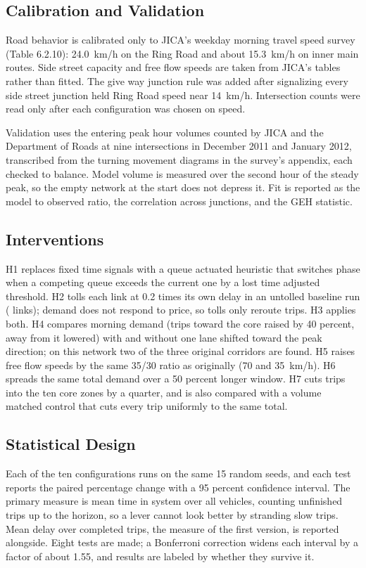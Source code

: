 \subsection{Calibration and Validation}
Road behavior is calibrated only to JICA's weekday morning travel speed survey (Table 6.2.10):
24.0~km/h on the Ring Road and about 15.3~km/h on inner main routes. Side street capacity and free
flow speeds are taken from JICA's tables rather than fitted. The give way junction rule was added
after signalizing every side street junction held Ring Road speed near 14~km/h. Intersection
counts were read only after each configuration was chosen on speed.

Validation uses the entering peak hour volumes counted by JICA and the Department of Roads at nine
intersections in December 2011 and January 2012, transcribed from the turning movement diagrams in
the survey's appendix, each checked to balance. Model volume is measured over the second hour of
the steady peak, so the empty network at the start does not depress it. Fit is reported as the
model to observed ratio, the correlation across junctions, and the GEH statistic.

\subsection{Interventions}
H1 replaces fixed time signals with a queue actuated heuristic that switches phase when a competing
queue exceeds the current one by a lost time adjusted threshold. H2 tolls each link at 0.2 times
its own delay in an untolled baseline run (\TolledLinks{} links); demand does not respond to price,
so tolls only reroute trips. H3 applies both. H4 compares morning demand (trips toward the core
raised by 40 percent, away from it lowered) with and without one lane shifted toward the peak
direction; on this network two of the three original corridors are found. H5 raises free flow
speeds by the same 35/30 ratio as originally (70 and 35~km/h). H6 spreads the same total demand
over a 50 percent longer window. H7 cuts trips into the ten core zones by a quarter, and is also
compared with a volume matched control that cuts every trip uniformly to the same total.

\subsection{Statistical Design}
Each of the ten configurations runs on the same 15 random seeds, and each test reports the paired
percentage change with a 95 percent confidence interval. The primary measure is mean time in system
over all vehicles, counting unfinished trips up to the horizon, so a lever cannot look better by
stranding slow trips. Mean delay over completed trips, the measure of the first version, is
reported alongside. Eight tests are made; a Bonferroni correction widens each interval by a factor
of about 1.55, and results are labeled by whether they survive it.
